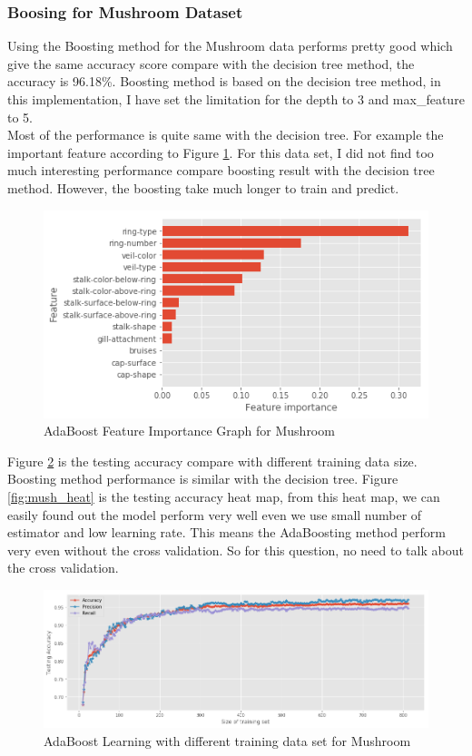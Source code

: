 \documentclass[10pt, conference, compsocconf]{IEEEtran}
\begin{document}
\subsubsection{Boosing for Mushroom Dataset}
Using the Boosting method for the Mushroom data performs pretty good which give the same accuracy score compare with the decision tree method, the accuracy is 96.18\%. Boosting method is based on the decision tree method, in this implementation, I have set the limitation for the depth to 3 and max\_feature to 5.\\
Most of the performance is quite same with the decision tree. For example the important feature according to Figure \ref{fig:mush_abd_import}. For this data set, I did not find too much interesting performance compare boosting result with the decision tree method. However, the boosting take much longer to train and predict. 
\begin{figure}[h]
	\centering
	\includegraphics[scale = 0.5]{image/abd_feature_important.png}
	\caption{AdaBoost Feature Importance Graph for Mushroom}
	\label{fig:mush_abd_import}
\end{figure}
Figure \ref{fig:mush_abd_learing} is the testing accuracy compare with different training data size. Boosting method performance is similar with the decision tree. Figure \ref{fig:mush_heat} is the testing accuracy heat map, from this heat map, we can easily found out the model perform very well even we use small number of estimator and low learning rate. This means the AdaBoosting method perform very even without the cross validation. So for this question, no need to talk about the cross validation. 
\begin{figure}[h]
	\centering
	\includegraphics[scale = 0.3]{image/mush_abd_learning.png}
	\caption{AdaBoost Learning with different training data set for Mushroom}
	\label{fig:mush_abd_learing}
\end{figure}
\end{document}
